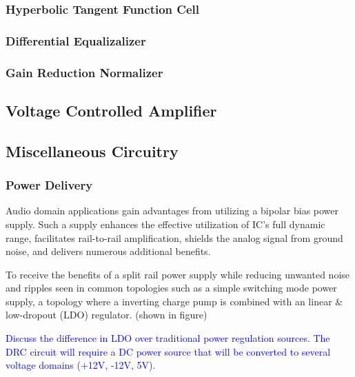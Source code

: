 \documentclass[10pt]{article}
\begin{document}
\begin{multicols}{2}
                \subsubsection{Hyperbolic Tangent Function Cell}
                \subsubsection{Differential Equalizalizer}
                \subsubsection{Gain Reduction Normalizer}
            
            \subsection{Voltage Controlled Amplifier}

            \subsection{Miscellaneous Circuitry}
                \subsubsection{Power Delivery}
                    Audio domain applications gain advantages from utilizing a bipolar bias power supply. Such a supply enhances the effective utilization of IC's full dynamic range, facilitates rail-to-rail amplification, shields the analog signal from ground noise, and delivers numerous additional benefits. \cite{ti-3-v-rails}\par
                    To receive the benefits of a split rail power supply while reducing unwanted noise and ripples seen in common topologies such as a simple switching mode power supply, a topology where a inverting charge pump is combined with an linear \& low-dropout (LDO) regulator. (shown in figure)\par
                    \textcolor{blue}{Discuss the difference in LDO over traditional power regulation sources. The DRC circuit will require a DC power source that will be converted to several voltage domains (+12V, -12V, 5V).}
                    
                    \noindent
                    \begin{minipage}{\linewidth}


\end{minipage}
\end{multicols}
\end{document}
